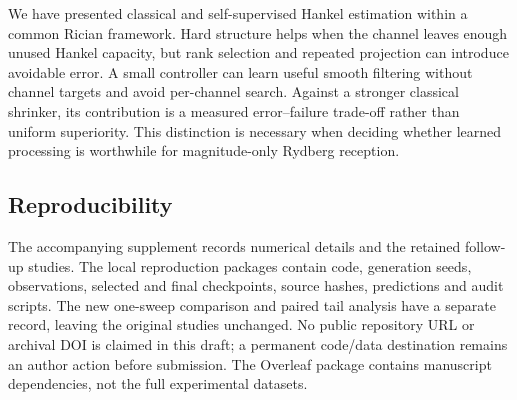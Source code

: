 \documentclass[10pt,journal,letterpaper]{IEEEtran}
\begin{document}
We have presented classical and self-supervised Hankel estimation within a common Rician framework. Hard structure helps when the channel leaves enough unused Hankel capacity, but rank selection and repeated projection can introduce avoidable error. A small controller can learn useful smooth filtering without channel targets and avoid per-channel search. Against a stronger classical shrinker, its contribution is a measured error--failure trade-off rather than uniform superiority. This distinction is necessary when deciding whether learned processing is worthwhile for magnitude-only Rydberg reception.

\subsection{Reproducibility}
The accompanying supplement records numerical details and the retained follow-up studies. The local reproduction packages contain code, generation seeds, observations, selected and final checkpoints, source hashes, predictions and audit scripts. The new one-sweep comparison and paired tail analysis have a separate record, leaving the original studies unchanged. No public repository URL or archival DOI is claimed in this draft; a permanent code/data destination remains an author action before submission. The Overleaf package contains manuscript dependencies, not the full experimental datasets.



\end{document}
